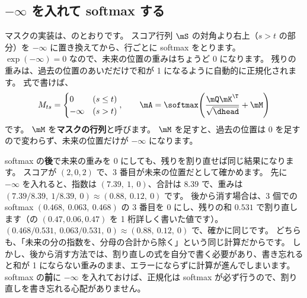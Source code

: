 \subsection*{$-\infty$ を入れて softmax する}

マスクの実装は、のとおりです。
スコア行列 $\mS$ の対角より右上（$s>t$ の部分）を $-\infty$ に置き換えてから、行ごとに softmax をとります。
$\exp(-\infty)=0$ なので、未来の位置の重みはちょうど 0 になります。
残りの重みは、過去の位置のあいだだけで和が 1 になるように自動的に正規化されます。
式で書けば、
\begin{equation}
M_{ts} = \begin{cases} 0 & (s\le t)\\ -\infty & (s>t)\end{cases},\qquad
\mA = \softmax\!\left(\frac{\mQ\mK^\T}{\sqrt{\dhead}} + \mM\right)
\label{eq:attn-causal}
\end{equation}
です。
$\mM$ を\textbf{マスクの行列}と呼びます。
$\mM$ を足すと、過去の位置は 0 を足すので変わらず、未来の位置だけが $-\infty$ になります。

softmax の\textbf{後}で未来の重みを 0 にしても、残りを割り直せば同じ結果になります。
スコアが $(2,0,2)$ で、3 番目が未来の位置だとして確かめます。
先に $-\infty$ を入れると、指数は $(7.39,\ 1,\ 0)$、合計は $8.39$ で、重みは $(7.39/8.39,\ 1/8.39,\ 0)\approx(0.88,\ 0.12,\ 0)$ です。
後から消す場合は、3 個での softmax $(0.468,\ 0.063,\ 0.468)$ の 3 番目を 0 にし、残りの和 $0.531$ で割り直します（の $(0.47, 0.06, 0.47)$ を 1 桁詳しく書いた値です）。
$(0.468/0.531,\ 0.063/0.531,\ 0)\approx(0.88,\ 0.12,\ 0)$ で、確かに同じです。
どちらも、「未来の分の指数を、分母の合計から除く」という同じ計算だからです。
しかし、後から消す方法では、割り直しの式を自分で書く必要があり、書き忘れると和が 1 にならない重みのまま、エラーにならずに計算が進んでしまいます。
softmax の\textbf{前}に $-\infty$ を入れておけば、正規化は softmax が必ず行うので、割り直しを書き忘れる心配がありません。


